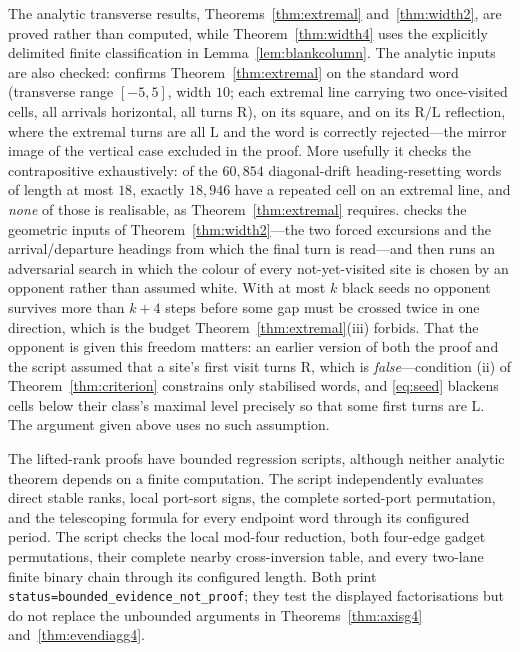 \documentclass[11pt,letterpaper]{article}
\theoremstyle{plain}
\theoremstyle{definition}
\newcommand{\turnR}{\mathrm{R}}
\newcommand{\turnL}{\mathrm{L}}
\begin{document}
\begin{NoHyper}
The analytic transverse results, Theorems~\ref{thm:extremal}
and~\ref{thm:width2}, are proved rather than computed, while
Theorem~\ref{thm:width4} uses the explicitly delimited finite classification in
Lemma~\ref{lem:blankcolumn}.  The analytic inputs are also checked:
 confirms
Theorem~\ref{thm:extremal} on the standard word (transverse range $[-5,5]$, width
$10$; each extremal line carrying two once-visited cells, all arrivals horizontal,
all turns $\turnR$), on its square, and on its $\turnR/\turnL$ reflection, where the
extremal turns are all $\turnL$ and the word is correctly rejected---the mirror image
of the vertical case excluded in the proof. More usefully it checks the
contrapositive exhaustively: of the $60{,}854$ diagonal-drift heading-resetting words
of length at most $18$, exactly $18{,}946$ have a repeated cell on an extremal line,
and \emph{none} of those is realisable, as Theorem~\ref{thm:extremal} requires.
 checks the geometric inputs of Theorem~\ref{thm:width2}---the
two forced excursions and the arrival/departure headings from which the final turn is
read---and then runs an adversarial search in which the colour of every
not-yet-visited site is chosen by an opponent rather than assumed white. With at most
$k$ black seeds no opponent survives more than $k+4$ steps before some gap must be
crossed twice in one direction, which is the budget Theorem~\ref{thm:extremal}(iii)
forbids. That the opponent is given this freedom matters: an earlier version of both
the proof and the script assumed that a site's first visit turns $\turnR$, which is
\emph{false}---condition (ii) of Theorem~\ref{thm:criterion} constrains only
stabilised words, and \eqref{eq:seed} blackens cells below their class's maximal
level precisely so that some first turns are $\turnL$. The argument given above uses
no such assumption.

The lifted-rank proofs have bounded regression scripts, although neither analytic
theorem depends on a finite computation.  The script
 independently evaluates direct stable ranks,
local port-sort signs, the complete sorted-port permutation, and the telescoping
formula for every endpoint word through its configured period.  The script
checks the local mod-four reduction,
both four-edge gadget permutations, their complete nearby cross-inversion table,
and every two-lane finite binary chain through its configured length.  Both print
\texttt{status=bounded\_evidence\_not\_proof}; they test the displayed
factorisations but do not replace the unbounded arguments in
Theorems~\ref{thm:axisg4} and~\ref{thm:evendiagg4}.


\end{NoHyper}
\end{document}
